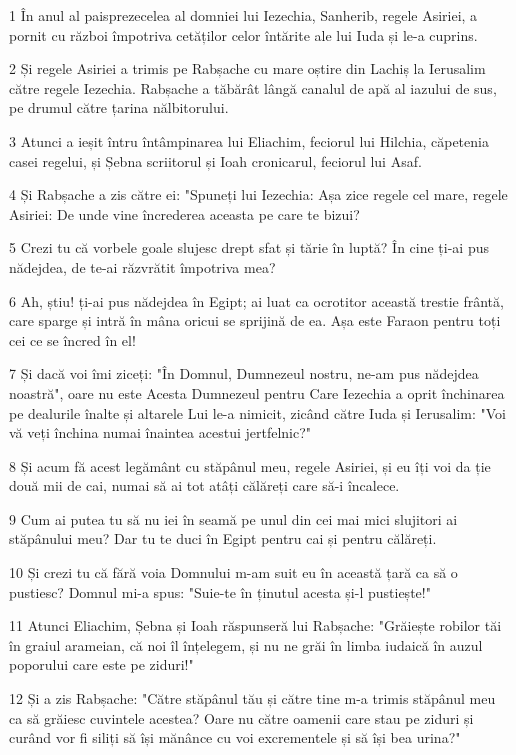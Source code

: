 \par 1 În anul al paisprezecelea al domniei lui Iezechia, Sanherib, regele Asiriei, a pornit cu război împotriva cetăților celor întărite ale lui Iuda și le-a cuprins.
\par 2 Și regele Asiriei a trimis pe Rabșache cu mare oștire din Lachiș la Ierusalim către regele Iezechia. Rabșache a tăbărât lângă canalul de apă al iazului de sus, pe drumul către țarina nălbitorului.
\par 3 Atunci a ieșit întru întâmpinarea lui Eliachim, feciorul lui Hilchia, căpetenia casei regelui, și Șebna scriitorul și Ioah cronicarul, feciorul lui Asaf.
\par 4 Și Rabșache a zis către ei: "Spuneți lui Iezechia: Așa zice regele cel mare, regele Asiriei: De unde vine încrederea aceasta pe care te bizui?
\par 5 Crezi tu că vorbele goale slujesc drept sfat și tărie în luptă? În cine ți-ai pus nădejdea, de te-ai răzvrătit împotriva mea?
\par 6 Ah, știu! ți-ai pus nădejdea în Egipt; ai luat ca ocrotitor această trestie frântă, care sparge și intră în mâna oricui se sprijină de ea. Așa este Faraon pentru toți cei ce se încred în el!
\par 7 Și dacă voi îmi ziceți: "În Domnul, Dumnezeul nostru, ne-am pus nădejdea noastră", oare nu este Acesta Dumnezeul pentru Care Iezechia a oprit închinarea pe dealurile înalte și altarele Lui le-a nimicit, zicând către Iuda și Ierusalim: "Voi vă veți închina numai înaintea acestui jertfelnic?"
\par 8 Și acum fă acest legământ cu stăpânul meu, regele Asiriei, și eu îți voi da ție două mii de cai, numai să ai tot atâți călăreți care să-i încalece.
\par 9 Cum ai putea tu să nu iei în seamă pe unul din cei mai mici slujitori ai stăpânului meu? Dar tu te duci în Egipt pentru cai și pentru călăreți.
\par 10 Și crezi tu că fără voia Domnului m-am suit eu în această țară ca să o pustiesc? Domnul mi-a spus: "Suie-te în ținutul acesta și-l pustiește!"
\par 11 Atunci Eliachim, Șebna și Ioah răspunseră lui Rabșache: "Grăiește robilor tăi în graiul arameian, că noi îl înțelegem, și nu ne grăi în limba iudaică în auzul poporului care este pe ziduri!"
\par 12 Și a zis Rabșache: "Către stăpânul tău și către tine m-a trimis stăpânul meu ca să grăiesc cuvintele acestea? Oare nu către oamenii care stau pe ziduri și curând vor fi siliți să își mănânce cu voi excrementele și să își bea urina?"
